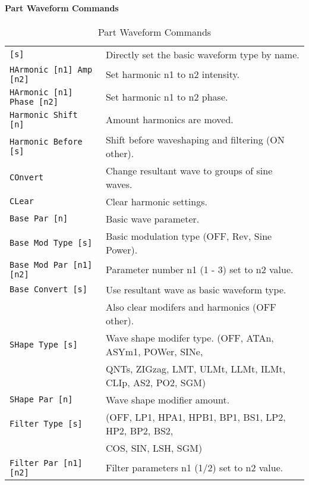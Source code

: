 \paragraph{Part Waveform Commands}
\label{paragraph:command_line_part_waveform_commands}

   \begin{table}[H]
      \centering
      \caption{Part Waveform Commands}
      \label{table:yoshimi_part_waveform_commands}
      \begin{tabular}{l l}

   \texttt{[s]} &
      Directly set the basic waveform type by name. \\
   \texttt{HArmonic [n1] Amp [n2]} &
      Set harmonic n1 to n2 intensity. \\
   \texttt{HArmonic [n1] Phase [n2]} &
      Set harmonic n1 to n2 phase. \\
   \texttt{Harmonic Shift [n]} &
      Amount harmonics are moved. \\
   \texttt{Harmonic Before [s]} &
      Shift before waveshaping and filtering (ON other). \\
   \texttt{COnvert} &
       Change resultant wave to groups of sine waves. \\
   \texttt{CLear} &
      Clear harmonic settings. \\
   \texttt{Base Par [n]} &
      Basic wave parameter. \\
   \texttt{Base Mod Type [s]} &
      Basic modulation type (OFF, Rev, Sine Power). \\
   \texttt{Base Mod Par [n1] [n2]} &
       Parameter number n1 (1 - 3) set to n2 value. \\
   \texttt{Base Convert [s]} &
       Use resultant wave as basic waveform type. \\
   \texttt{} &
      Also clear modifers and harmonics (OFF other). \\
   \texttt{SHape Type [s] } &
      Wave shape modifer type. (OFF, ATAn, ASYm1, POWer, SINe,\\
   \texttt{} &
       QNTs, ZIGzag, LMT, ULMt, LLMt, ILMt, CLIp, AS2, PO2, SGM) \\
   \texttt{SHape Par [n]} &
      Wave shape modifier amount. \\
   \texttt{Filter Type [s]} &
      (OFF, LP1, HPA1, HPB1, BP1, BS1, LP2, HP2, BP2, BS2, \\
      \texttt{} &
      COS, SIN, LSH, SGM)\\
   \texttt{Filter Par [n1] [n2]} &
      Filter parameters  n1 (1/2) set to n2 value. \\

\end{tabular}
\end{table}
